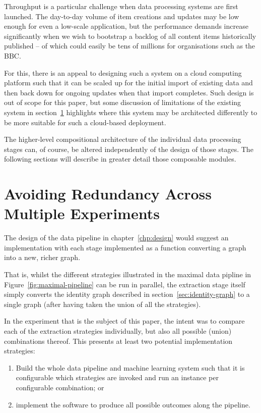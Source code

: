 Throughput is a particular challenge when data processing systems
are first launched. The day-to-day volume of item creations and
updates may be low enough for even a low-scale application, but the
performance demands increase significantly when we wish to bootstrap
a backlog of all content items historically published -- of which
could easily be tens of millions for organisations such as the BBC.

For this, there is an
appeal to designing such a system on a cloud computing platform such
that it can be scaled up for the initial import of existing data and
then back down for ongoing updates when that import completes. Such
design is out of scope for this paper, but some discussion of
limitations of the existing system in section~\ref{} highlights where
this system may be architected differently to be more suitable for
such a cloud-based deployment.

The higher-level compositional architecture of the individual
data processing stages can, of course, be altered independently of
the design of those stages. The following sections will describe in
greater detail those composable modules.

\section{Avoiding Redundancy Across Multiple Experiments}

The design of the data pipeline in chapter~\ref{chp:design} would
suggest an implementation with each stage implemented as a function
converting a graph into a new, richer graph.

That is, whilst the different strategies illustrated in the maximal
data pipline in Figure~\ref{fig:maximal-pipeline} can be run in
parallel, the extraction stage itself simply converts the identity
graph described in section~\ref{sec:identity-graph} to a single graph
(after having taken the union of all the strategies).

In the experiment that is the subject of this paper, the intent was
to compare each of the extraction strategies individually, but also
all possible (union) combinations thereof. This presents at least
two potential implementation strategies:

\begin{enumerate}
\item Build the whole data pipeline and machine learning system such
  that it is configurable which strategies are invoked and run an
  instance per configurable combination; or
\item implement the software to produce all possible outcomes along
  the pipeline.
\end{enumerate}


